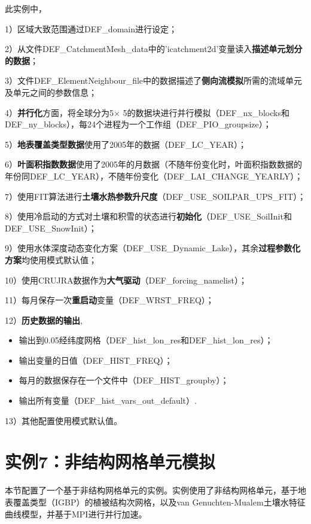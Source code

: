 \documentclass[a4paper,12pt,twoside]{article}
\begin{document}
此实例中，\par
1）区域大致范围通过DEF\_domain进行设定；\par
2）从文件DEF\_CatchmentMesh\_data中的'icatchment2d'变量读入\textbf{描述单元划分的数据}；\par
3）文件DEF\_ElementNeighbour\_file中的数据描述了\textbf{侧向流模拟}所需的流域单元及单元之间的参数信息；\par
4）\textbf{并行化}方面，将全球分为5\textdegree$\times$ 5\textdegree 的数据块进行并行模拟（DEF\_nx\_blocks和DEF\_ny\_blocks），每24个进程为一个工作组（DEF\_PIO\_groupsize）；\par
5）\textbf{地表覆盖类型数据}使用了2005年的数据（DEF\_LC\_YEAR）；\par
6）\textbf{叶面积指数数据}使用了2005年的月数据（不随年份变化时，叶面积指数数据的年份同DEF\_LC\_YEAR），不随年份变化（DEF\_LAI\_CHANGE\_YEARLY）；\par
7）使用FIT算法进行\textbf{土壤水热参数升尺度}（DEF\_USE\_SOILPAR\_UPS\_FIT）；\par
8）使用冷启动的方式对土壤和积雪的状态进行\textbf{初始化}（DEF\_USE\_SoilInit和DEF\_USE\_SnowInit）；\par
9）使用水体深度动态变化方案（DEF\_USE\_Dynamic\_Lake），其余\textbf{过程参数化方案}均使用模式默认值；\par
10）使用CRUJRA数据作为\textbf{大气驱动}（DEF\_forcing\_namelist）；\par
11）每月保存一次\textbf{重启动}变量（DEF\_WRST\_FREQ）；\par
12）\textbf{历史数据的输出},
\begin{itemize}[nosep,leftmargin=4em]
    \item 输出到0.05\textdegree 经纬度网格（DEF\_hist\_lon\_res和DEF\_hist\_lon\_res）；
    \item 输出变量的日值（DEF\_HIST\_FREQ）；
    \item 每月的数据保存在一个文件中（DEF\_HIST\_groupby）；
    \item 输出所有变量（DEF\_hist\_vars\_out\_default）.
\end{itemize}\par
13）其他配置使用模式默认值。


\section{实例7：非结构网格单元模拟}

本节配置了一个基于非结构网格单元的实例。实例使用了非结构网格单元，基于地表覆盖类型（IGBP）的植被结构次网格，以及van Genuchten-Mualem土壤水特征曲线模型，并基于MPI进行并行加速。
\end{document}
